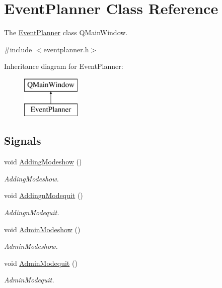 \hypertarget{class_event_planner}{}\section{Event\+Planner Class Reference}
\label{class_event_planner}


The \hyperlink{class_event_planner}{Event\+Planner} class  Q\+Main\+Window.  




{\ttfamily \#include $<$eventplanner.\+h$>$}

Inheritance diagram for Event\+Planner\+:\begin{figure}[H]
\begin{center}
\leavevmode
\includegraphics[height=2.000000cm]{class_event_planner}
\end{center}
\end{figure}
\subsection*{Signals}
\begin{DoxyCompactItemize}
\item 
void \hyperlink{class_event_planner_ac29d7162ba23478a3ca83d9a3451317e}{Adding\+Modeshow} ()
\begin{DoxyCompactList}\small\item\em Adding\+Modeshow. \end{DoxyCompactList}\item 
void \hyperlink{class_event_planner_a11d013b57831e685d134d824db883ad3}{Addingn\+Modequit} ()
\begin{DoxyCompactList}\small\item\em Addingn\+Modequit. \end{DoxyCompactList}\item 
void \hyperlink{class_event_planner_ae781e84143069d552b60b7856e7b0ad6}{Admin\+Modeshow} ()
\begin{DoxyCompactList}\small\item\em Admin\+Modeshow. \end{DoxyCompactList}\item 
void \hyperlink{class_event_planner_ab721a944eda1470ebb158bc815cc8734}{Admin\+Modequit} ()
\begin{DoxyCompactList}\small\item\em Admin\+Modequit. \end{DoxyCompactList}\end{DoxyCompactItemize}
